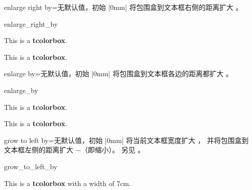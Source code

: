 \begin{docTcbKey}{enlarge right by}{=}{无默认值，初始 |0mm|}
  将包围盒到文本框右侧的距离扩大 。
\begin{exdispExample}[safety=2cm]{enlarge_right_by}

\begin{tcolorbox}[enlarge right by=-2cm,width=\linewidth+2cm,
  enhanced,show bounding box]
This is a \textbf{tcolorbox}.
\end{tcolorbox}
\begin{tcolorbox}[enlarge right by=2cm,width=\linewidth-2cm]
This is a \textbf{tcolorbox}.
\end{tcolorbox}
\end{exdispExample}
\end{docTcbKey}

\clearpage
\begin{docTcbKey}{enlarge by}{=}{无默认值，初始 |0mm|}
  将包围盒到文本框各边的距离都扩大 。
\begin{exdispExample}{enlarge_by}

\begin{tcolorbox}
This is a \textbf{tcolorbox}.
\end{tcolorbox}
\begin{tcolorbox}[enlarge by=5mm,enhanced,show bounding box]
This is a \textbf{tcolorbox}.
\end{tcolorbox}
\end{exdispExample}
\end{docTcbKey}



\begin{docTcbKey}{grow to left by}{=}{无默认值，初始 |0mm|}
  将当前文本框宽度扩大 ，
  并将包围盒到文本框左侧的距离扩大 $-$（即缩小）。
  另见 。
\begin{exdispExample}[safety=2cm]{grow_to_left_by}

\begin{tcolorbox}[width=5cm,grow to left by=2cm,enhanced,show bounding box]
This is a \textbf{tcolorbox} with a width of 7cm.
\end{tcolorbox}
\end{exdispExample}
\end{docTcbKey}

